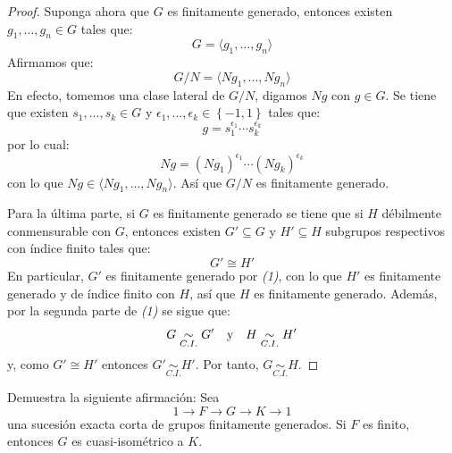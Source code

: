 \documentclass[12pt]{report}
\newcounter{it}
\theoremstyle{largebreak}
\newcommand{\gen}[1]{\ensuremath{\langle#1\rangle}}
\newcommand{\qisom}{\ensuremath{\underset{C.I.}{\sim}}}
\begin{document}
\begin{proof}
        Suponga ahora que $G$ es finitamente generado, entonces existen $g_1,...,g_n\in G$ tales que:
        \begin{equation*}
            G=\gen{g_1,...,g_n}
        \end{equation*}
        Afirmamos que:
        \begin{equation*}
            G/N=\gen{Ng_1,...,Ng_n }
        \end{equation*}
        En efecto, tomemos una clase lateral de $G/N$, digamos $Ng$ con $g\in G$. Se tiene que existen $s_1,...,s_k\in G$ y $\epsilon_1,...,\epsilon_k\in\left\{-1,1\right\}$ tales que:
        \begin{equation*}
            g=s_1^{\epsilon_1}\cdots s_k^{\epsilon_k}
        \end{equation*}
        por lo cual:
        \begin{equation*}
            Ng=(Ng_1)^{\epsilon_1}\cdots (Ng_k)^{\epsilon_k}
        \end{equation*}
        con lo que $Ng\in\gen{Ng_1,...,Ng_n }$. Así que $G/N$ es finitamente generado.

        Para la última parte, si $G$ es finitamente generado se tiene que si $H$ débilmente conmensurable con $G$, entonces existen $G'\subseteq G$ y $H'\subseteq H$ subgrupos respectivos con índice finito tales que:
        \begin{equation*}
            G'\cong H'
        \end{equation*}
        En particular, $G'$ es finitamente generado por \textit{(1)}, con lo que $H'$ es finitamente generado y de índice finito con $H$, así que $H$ es finitamente generado. Además, por la segunda parte de \textit{(1)} se sigue que:
        \begin{equation*}
            G\qisom G'\quad\textup{y}\quad H\qisom H'
        \end{equation*}
        y, como $G'\cong H'$ entonces $G'\qisom H'$. Por tanto, $G\qisom H$.
    \end{proof}

    \begin{excer}
        Demuestra la siguiente afirmación: Sea
        \begin{equation*}
            1\rightarrow F\rightarrow G\rightarrow K\rightarrow1
        \end{equation*}
        una sucesión exacta corta de grupos finitamente generados. Si $F$ es finito, entonces $G$ es cuasi-isométrico a $K$.
    \end{excer}
\end{document}

